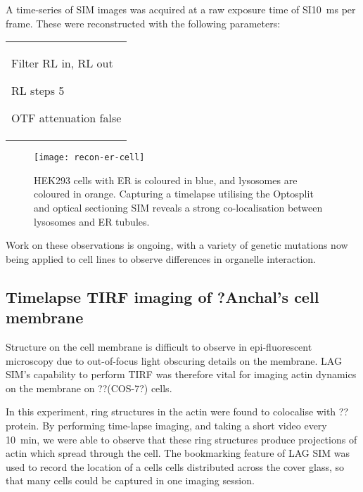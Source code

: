 A time-series of SIM images was acquired at a raw exposure time of SI\SI{10}{\milli\second} per frame. 
These were reconstructed with the following parameters: \newline
\begin{tabular}{p{}}
\begin{labelling}[margin=OTF attenuation]
	\item[Filter] RL in, RL out
	\item[RL steps] 5
	\item[OTF attenuation] false
\end{labelling}
\end{tabular}

\begin{figure}[tbp!]
\centering
\texttt{[image: recon-er-cell]}
\caption[LAG SIM: Fast, multi-colour imaging of ER in cells reveals co-localisation between lysosomes and ER tubules]{HEK293 cells with ER is coloured in blue, and lysosomes are coloured in orange. Capturing a timelapse utilising the Optosplit and optical sectioning SIM reveals a strong co-localisation between lysosomes and ER tubules. }
\label{fig:recon-er-cell}
\end{figure}

Work on these observations is ongoing, with a variety of genetic mutations now being applied to cell lines to observe differences in organelle interaction. 


\subsection{Timelapse TIRF imaging of ?Anchal's cell membrane}
Structure on the cell membrane is difficult to observe in epi-fluorescent microscopy due to out-of-focus light obscuring details on the membrane. 
LAG SIM's capability to perform TIRF was therefore vital for imaging actin dynamics on the membrane on ??(COS-7?) cells. 

In this experiment, ring structures in the actin were found to colocalise with ??protein. 
By performing time-lapse imaging, and taking a short video every \SI{10}{\minute}, we were able to observe that these ring structures produce projections of actin which spread through the cell. 
The bookmarking feature of LAG SIM was used to record the location of a cells cells distributed across the cover glass, so that many cells could be captured in one imaging session. 

